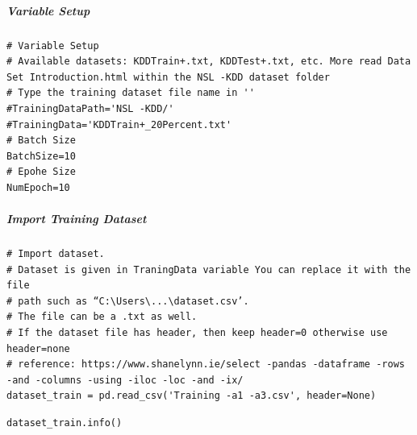 \subparagraph{Variable Setup}

\begin{verbatim}
# Variable Setup
# Available datasets: KDDTrain+.txt, KDDTest+.txt, etc. More read Data Set Introduction.html within the NSL -KDD dataset folder
# Type the training dataset file name in ''
#TrainingDataPath='NSL -KDD/'
#TrainingData='KDDTrain+_20Percent.txt'
# Batch Size
BatchSize=10
# Epohe Size
NumEpoch=10
\end{verbatim}

\subparagraph{Import Training Dataset}

\begin{verbatim}
# Import dataset.
# Dataset is given in TraningData variable You can replace it with the file 
# path such as “C:\Users\...\dataset.csv’. 
# The file can be a .txt as well. 
# If the dataset file has header, then keep header=0 otherwise use header=none
# reference: https://www.shanelynn.ie/select -pandas -dataframe -rows -and -columns -using -iloc -loc -and -ix/
dataset_train = pd.read_csv('Training -a1 -a3.csv', header=None)
\end{verbatim}

\begin{verbatim}
dataset_train.info()
\end{verbatim}

